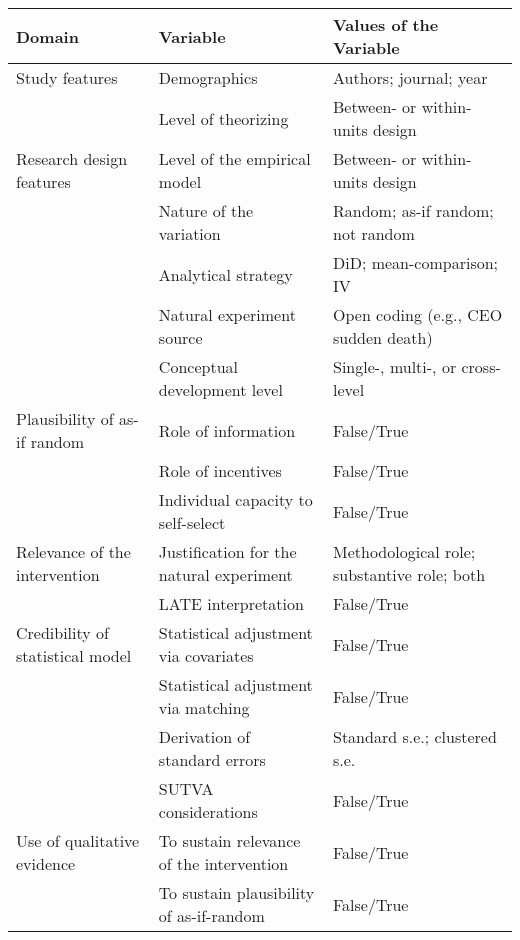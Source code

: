 \begin{tabular}{p{4.5cm} p{5.5cm} p{5.5cm}}
\toprule \toprule
    Domain & Variable & Values of the Variable \\ \midrule
    Study features \dotfill & Demographics & Authors; journal; year \\ 
     & Level of theorizing & Between- or within-units design \\ 
    Research design features \dotfill & Level of the empirical model & Between- or within-units design \\ \
     & Nature of the variation & Random; as-if random; not random \\ 
     & Analytical strategy & DiD; mean-comparison; IV \\ 
     & Natural experiment source & Open coding (e.g., CEO sudden death) \\ 
     & Conceptual development level & Single-, multi-, or cross-level \\ 
     Plausibility of as-if random\dotfill & Role of information & False/True \\ 
     & Role of incentives & False/True \\ 
     & Individual capacity to self-select & False/True \\ 
    Relevance of the intervention \dotfill& Justification for the natural experiment & Methodological role; substantive role; both \\ 
    & LATE interpretation & False/True \\
    Credibility of statistical model \dotfill & Statistical adjustment via covariates & False/True \\ 
     & Statistical adjustment via matching & False/True \\ 
     & Derivation of standard errors & Standard s.e.; clustered s.e. \\ 
     & SUTVA considerations & False/True \\
    Use of qualitative evidence \dotfill & To sustain relevance of the intervention & False/True \\ 
     & To sustain plausibility of as-if-random & False/True \\ \bottomrule
\end{tabular}

